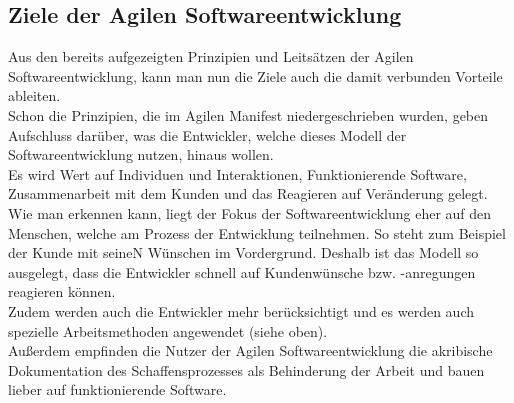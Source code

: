 \documentclass[a4paper, 10pt]{scrartcl}
\begin{document}
\subsection{Ziele der Agilen Softwareentwicklung}
Aus den bereits aufgezeigten Prinzipien und Leitsätzen der Agilen Softwareentwicklung, kann man nun die Ziele  auch die damit verbunden Vorteile ableiten. \\
Schon die Prinzipien, die im \glqq{}Agilen Manifest\grqq{} niedergeschrieben wurden, geben Aufschluss darüber, was die Entwickler, welche dieses Modell der Softwareentwicklung nutzen, hinaus wollen.\\ Es wird Wert auf \glqq{}Individuen und Interaktionen, Funktionierende Software, Zusammenarbeit mit dem Kunden und das Reagieren auf Veränderung\grqq{} \cite{Beck2013} gelegt. Wie man erkennen kann, liegt der Fokus der Softwareentwicklung eher auf den Menschen, welche am Prozess der Entwicklung teilnehmen. So steht zum Beispiel der Kunde mit seineN Wünschen im Vordergrund. Deshalb ist das Modell so ausgelegt, dass die Entwickler schnell auf Kundenwünsche bzw. -anregungen reagieren können.\\ Zudem werden auch die Entwickler mehr berücksichtigt und es werden auch spezielle Arbeitsmethoden angewendet (siehe oben).\\Außerdem empfinden die Nutzer der Agilen Softwareentwicklung die akribische Dokumentation des Schaffensprozesses als Behinderung der Arbeit und bauen lieber auf \glqq funktionierende Software\grqq. \citep{Beck2013} 
\end{document}
